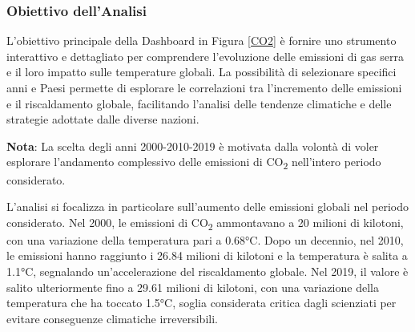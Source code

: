 \subsubsection{Obiettivo dell'Analisi}
L'obiettivo principale della Dashboard in Figura \ref{CO2} è fornire uno strumento interattivo e dettagliato per comprendere l'evoluzione delle emissioni di gas serra e il loro impatto sulle temperature globali. La possibilità di selezionare specifici anni e Paesi permette di esplorare le correlazioni tra l'incremento delle emissioni e il riscaldamento globale, facilitando l'analisi delle tendenze climatiche e delle strategie adottate dalle diverse nazioni.

\begin{myoutline}
    \textbf{Nota}: La scelta degli anni 2000-2010-2019 è motivata dalla volontà di voler esplorare l'andamento complessivo delle emissioni di CO\textsubscript{2} nell'intero periodo considerato.
\end{myoutline}

L'analisi si focalizza in particolare sull'aumento delle emissioni globali nel periodo considerato. Nel 2000, le emissioni di CO\textsubscript{2} ammontavano a 20 milioni di kilotoni, con una variazione della temperatura pari a 0.68°C. Dopo un decennio, nel 2010, le emissioni hanno raggiunto i 26.84 milioni di kilotoni e la temperatura è salita a 1.1°C, segnalando un'accelerazione del riscaldamento globale. Nel 2019, il valore è salito ulteriormente fino a 29.61 milioni di kilotoni, con una variazione della temperatura che ha toccato 1.5°C, soglia considerata critica dagli scienziati per evitare conseguenze climatiche irreversibili.

